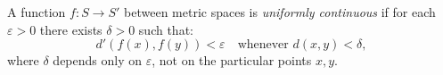 A function $f: S \to S'$ between metric spaces is \textit{uniformly continuous} if for each $\varepsilon > 0$ there exists $\delta > 0$ such that:
\[
d'(f(x), f(y)) < \varepsilon \quad \text{whenever } d(x, y) < \delta,
\]
where $\delta$ depends only on $\varepsilon$, not on the particular points $x, y$.
